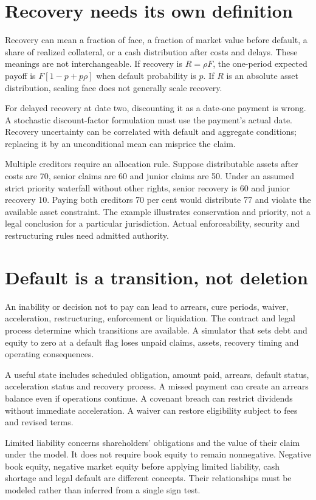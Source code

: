 \section{Recovery needs its own definition}
Recovery can mean a fraction of face, a fraction of market value before default, a share of realized collateral, or a cash distribution after costs and delays. These meanings are not interchangeable. If recovery is $R=\rho F$, the one-period expected payoff is $F[1-p+p\rho]$ when default probability is $p$. If $R$ is an absolute asset distribution, scaling face does not generally scale recovery.

For delayed recovery at date two, discounting it as a date-one payment is wrong. A stochastic discount-factor formulation must use the payment's actual date. Recovery uncertainty can be correlated with default and aggregate conditions; replacing it by an unconditional mean can misprice the claim.

Multiple creditors require an allocation rule. Suppose distributable assets after costs are 70, senior claims are 60 and junior claims are 50. Under an assumed strict priority waterfall without other rights, senior recovery is 60 and junior recovery 10. Paying both creditors 70 per cent would distribute 77 and violate the available asset constraint. The example illustrates conservation and priority, not a legal conclusion for a particular jurisdiction. Actual enforceability, security and restructuring rules need admitted authority.

\section{Default is a transition, not deletion}
An inability or decision not to pay can lead to arrears, cure periods, waiver, acceleration, restructuring, enforcement or liquidation. The contract and legal process determine which transitions are available. A simulator that sets debt and equity to zero at a default flag loses unpaid claims, assets, recovery timing and operating consequences.

A useful state includes scheduled obligation, amount paid, arrears, default status, acceleration status and recovery process. A missed payment can create an arrears balance even if operations continue. A covenant breach can restrict dividends without immediate acceleration. A waiver can restore eligibility subject to fees and revised terms.

Limited liability concerns shareholders' obligations and the value of their claim under the model. It does not require book equity to remain nonnegative. Negative book equity, negative market equity before applying limited liability, cash shortage and legal default are different concepts. Their relationships must be modeled rather than inferred from a single sign test.

